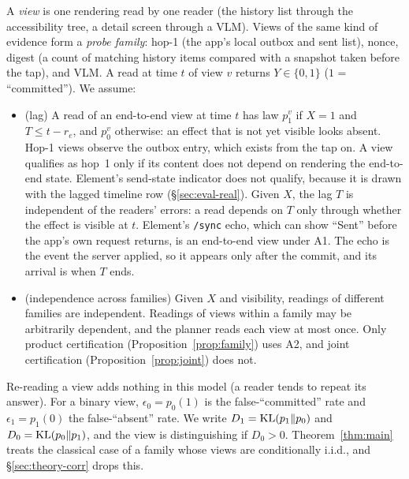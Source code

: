 A \emph{view} is one rendering read by one reader (the history list through the accessibility tree, a detail screen through a VLM). Views of the same kind of evidence form a \emph{probe family}: hop-1 (the app's local outbox and sent list), nonce, digest
(a count of matching history items compared with a snapshot taken before the tap), and VLM. A read at time $t$ of view $v$ returns $Y\in\{0,1\}$ ($1$ = ``committed'').
We assume:
\begin{itemize}[leftmargin=*,topsep=1pt,itemsep=0pt]
\item[\textbf{A1}] (lag) A read of an end-to-end view at time $t$ has law $p^v_1$ if $X{=}1$ and $T\le t-r_e$, and $p^v_0$ otherwise:
an effect that is not yet visible looks absent. Hop-1 views observe the outbox entry, which exists from the tap on. A view qualifies as hop~1 only if its content
does not depend on rendering the end-to-end state. Element's send-state indicator does not qualify, because it is drawn with the lagged timeline row (\S\ref{sec:eval-real}).
Given $X$, the lag $T$ is independent of the readers' errors: a read depends on $T$ only through whether the effect is visible at $t$.
Element's \texttt{/sync} echo, which can show ``Sent'' before the app's own request returns, is an end-to-end view under A1. The echo is the event the server applied, so it appears only after the commit, and its arrival is when $T$ ends.
\item[\textbf{A2}] (independence across families) Given $X$ and visibility, readings of different families are independent.
Readings of views within a family may be arbitrarily dependent, and the planner reads each view at most once. Only product certification
(Proposition~\ref{prop:family}) uses A2, and joint certification (Proposition~\ref{prop:joint}) does not.
\end{itemize}
Re-reading a view adds nothing in this model (a reader tends to repeat its answer). For a binary view, $\epsilon_0=p_0(1)$ is the false-``committed'' rate and $\epsilon_1=p_1(0)$ the false-``absent'' rate.
We write $D_1=\mathrm{KL}(p_1\|p_0)$ and $D_0=\mathrm{KL}(p_0\|p_1)$, and the view is distinguishing if $D_0>0$. Theorem~\ref{thm:main} treats the classical case of a family whose
views are conditionally i.i.d., and \S\ref{sec:theory-corr} drops this.


